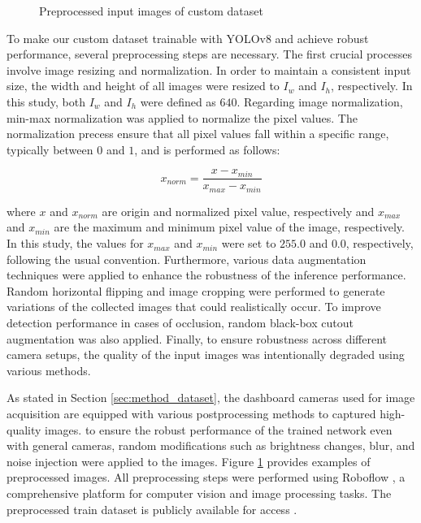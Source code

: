 \begin{figure}[b!]
\caption{Preprocessed input images of custom dataset}
\label{fig:custom_dataset}%
\end{figure}

To make our custom dataset trainable with YOLOv8 and achieve robust performance, several preprocessing steps are necessary.
The first crucial processes involve image resizing and normalization.
In order to maintain a consistent input size, the width and height of all images were resized to $I_{w}$ and $I_{h}$, respectively. 
In this study, both $I_{w}$ and $I_{h}$ were defined as $640$.
Regarding image normalization, min-max normalization was applied to normalize the pixel values.
The normalization precess ensure that all pixel values fall within a specific range, typically between $0$ and $1$, and is performed as follows:

\begin{equation}
    x_{norm} = \frac{x - x_{min}}{x_{max} - x_{min}}
\end{equation}

where $x$ and $x_{norm}$ are origin and normalized pixel value, respectively and $x_{max}$ and $x_{min}$ are the maximum and minimum pixel value of the image, respectively.
In this study, the values for $x_{max}$ and $x_{min}$ were set to $255.0$ and $0.0$, respectively, following the usual convention.
Furthermore, various data augmentation techniques were applied to enhance the robustness of the inference performance.
Random horizontal flipping and image cropping were performed to generate variations of the collected images that could realistically occur.
To improve detection performance in cases of occlusion, random black-box cutout augmentation was also applied.
Finally, to ensure robustness across different camera setups, the quality of the input images was intentionally degraded using various methods.



As stated in Section \ref{sec:method_dataset}, the dashboard cameras used for image acquisition are equipped with various postprocessing methods to captured high-quality images.
to ensure the robust performance of the trained network even with general cameras, random modifications such as brightness changes, blur, and noise injection were applied to the images.
Figure \ref{fig:custom_dataset} provides examples of preprocessed images.
All preprocessing steps were performed using Roboflow \cite{roboflow}, a comprehensive platform for computer vision and image processing tasks.
The preprocessed train dataset is publicly available for access \cite{brake-light-detection_dataset}.



